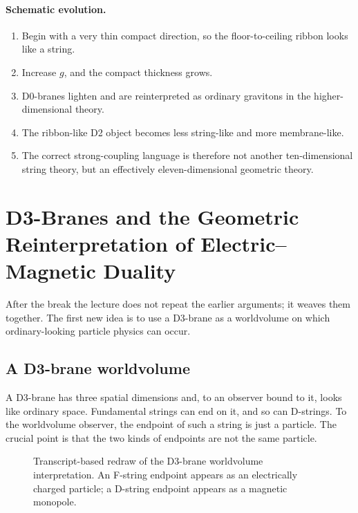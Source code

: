 \paragraph{Schematic evolution.}
\begin{enumerate}
\item Begin with a very thin compact direction, so the floor-to-ceiling ribbon looks like a string.
\item Increase \(g\), and the compact thickness grows.
\item D0-branes lighten and are reinterpreted as ordinary gravitons in the higher-dimensional theory.
\item The ribbon-like D2 object becomes less string-like and more membrane-like.
\item The correct strong-coupling language is therefore not another ten-dimensional string theory, but an effectively eleven-dimensional geometric theory.
\end{enumerate}

\section{D3-Branes and the Geometric Reinterpretation of Electric--Magnetic Duality}

After the break the lecture does not repeat the earlier arguments; it weaves them together. The first new idea is to use a D3-brane as a worldvolume on which ordinary-looking particle physics can occur.

\subsection{A D3-brane worldvolume}

A D3-brane has three spatial dimensions and, to an observer bound to it, looks like ordinary space. Fundamental strings can end on it, and so can D-strings. To the worldvolume observer, the endpoint of such a string is just a particle. The crucial point is that the two kinds of endpoints are not the same particle.

\begin{figure}[h]
\centering
{}
\caption{Transcript-based redraw of the D3-brane worldvolume interpretation. An F-string endpoint appears as an electrically charged particle; a D-string endpoint appears as a magnetic monopole.}
\end{figure}

